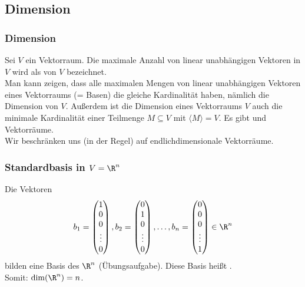 \subsection{Dimension}
%
\begin{frame}\frametitle{Dimension}
	
	Sei $V$ ein Vektorraum. 
	Die maximale Anzahl von linear unabhängigen Vektoren in $V$ wird als  von $V$ bezeichnet.\\
	\vfill
	\pause
	Man kann zeigen, dass alle maximalen Mengen von linear unabhängigen Vektoren eines Vektorraums (= Basen) die gleiche Kardinalität haben, nämlich die Dimension von $V$.\pause
	\vfill
	Außerdem ist die Dimension eines Vektorraums $V$ auch die minimale Kardinalität einer Teilmenge $M \subseteq V$ mit $\langle M \rangle=V$.
	\vfill
	\pause
	Es gibt  und  Vektorräume. \\[1mm]
	Wir beschränken uns (in der Regel) auf endlichdimensionale Vektorräume.
	
\end{frame}
%
%
\begin{frame}\frametitle{Standardbasis in $V=\R^n$}
	
	Die Vektoren
	$$
		b_1 = \begin{pmatrix} 1\\ 0 \\ 0\\ \vdots \\ 0 \end{pmatrix},
		b_2 = \begin{pmatrix} 0\\ 1 \\ 0\\ \vdots \\ 0 \end{pmatrix},
		\ldots,
		b_n = \begin{pmatrix} 0\\ 0 \\ 0\\ \vdots \\ 1 \end{pmatrix} \in \R^n
	$$	
	bilden eine Basis des $\R^n$ (\"Ubungsaufgabe). Diese Basis hei{\ss}t .\\[1mm]
	
	Somit: $\dim(\R^n) = n$.
	
\end{frame}
%

%

%

